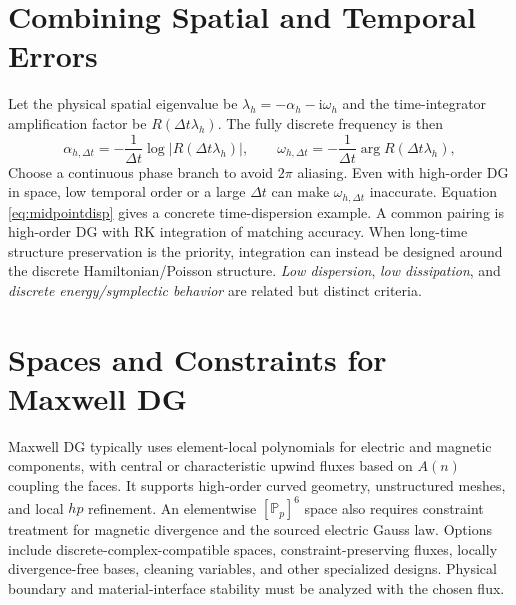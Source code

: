\documentclass[11pt,openany]{book}
\numberwithin{equation}{chapter}
\theoremstyle{definition}
\theoremstyle{remark}
\begin{document}
\section{Combining Spatial and Temporal Errors}
Let the physical spatial eigenvalue be $\lambda_h=-\alpha_h-\mathrm i\omega_h$
and the time-integrator amplification factor be $R(\Delta t\lambda_h)$.
The fully discrete frequency is then
\begin{equation}\label{eq:fullfrequencies}
\alpha_{h,\Delta t}=-\frac1{\Delta t}\log|R(\Delta t\lambda_h)|,
\qquad
\omega_{h,\Delta t}=-\frac1{\Delta t}\arg R(\Delta t\lambda_h),
\end{equation}
Choose a continuous phase branch to avoid $2\pi$ aliasing.
Even with high-order DG in space, low temporal order or a large $\Delta t$ can make $\omega_{h,\Delta t}$ inaccurate.
Equation \eqref{eq:midpointdisp} gives a concrete time-dispersion example.
A common pairing is high-order DG with RK integration of matching accuracy.
When long-time structure preservation is the priority, integration can instead be designed around the discrete Hamiltonian/Poisson structure.
\emph{Low dispersion}, \emph{low dissipation}, and \emph{discrete energy/symplectic behavior} are related but distinct criteria.

\section{Spaces and Constraints for Maxwell DG}
Maxwell DG typically uses element-local polynomials for electric and magnetic components,
with central or characteristic upwind fluxes based on $A(n)$ coupling the faces.
It supports high-order curved geometry, unstructured meshes, and local $hp$ refinement.
An elementwise $[\mathbb P_p]^6$ space also requires constraint treatment for magnetic divergence and the sourced electric Gauss law.
Options include discrete-complex-compatible spaces, constraint-preserving fluxes, locally divergence-free bases, cleaning variables, and other specialized designs.
Physical boundary and material-interface stability must be analyzed with the chosen flux.
\end{document}
